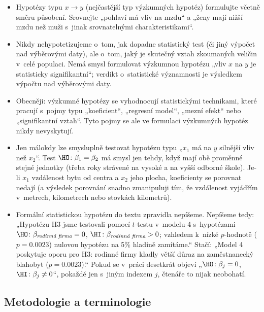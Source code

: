 \documentclass[11pt,a4paper]{article}
\begin{document}
\begin{itemize}[itemsep=2pt, topsep=2pt]
  \item Hypotézy typu $x \to y$ (nejčastější typ výzkumných hypotéz) formulujte včetně směru působení. Srovnejte „pohlaví má vliv na mzdu“ a „ženy mají nižší mzdu než muži s~jinak srovnatelnými charakteristikami“.
  \item Nikdy nehypotetizujeme o~tom, jak dopadne statistický test (či jiný výpočet nad výběrovými daty), ale o~tom, jaký je skutečný vztah zkoumaných veličin v~celé populaci. Nemá smysl formulovat výzkumnou hypotézu „vliv $x$ na $y$ je statisticky signifikantní“; verdikt o~statistické významnosti je výsledkem výpočtu nad výběrovými daty.
  \item Obecněji: výzkumné hypotézy se vyhodnocují statistickými technikami, které pracují s~pojmy typu „koeficient“, „regresní model“, „mezní efekt“ nebo „signifikantní vztah“. Tyto pojmy se ale ve formulaci výzkumných hypotéz nikdy nevyskytují.
  \item Jen málokdy lze smysluplně testovat hypotézu typu „$x_1$ má na $y$ silnější vliv než $x_2$“. Test $\HO\colon \beta_1 = \beta_2$ má smysl jen tehdy, když mají obě proměnné stejné jednotky (třeba roky strávené na vysoké a na vyšší odborné škole). Je-li $x_1$ vzdálenost bytu od centra a $x_2$ jeho plocha, koeficienty se porovnat nedají (a výsledek porovnání snadno zmanipuluji tím, že vzdálenost vyjádřím v~metrech, kilometrech nebo stovkách kilometrů).
  \item Formální statistickou hypotézu do textu zpravidla nepíšeme. Nepíšeme tedy: „Hypotézu H3 jsme testovali pomocí $t$-testu v~modelu 4 s~hypotézami $\HO\colon \beta_{\textit{rodinná firma}} = 0$, $\HI\colon \beta_{\textit{rodinná firma}} > 0$; vzhledem k~nízké $p$-hodnotě ($p = 0.0023$) nulovou hypotézu na 5\% hladině zamítáme.“ Stačí: „Model 4 poskytuje oporu pro H3: rodinné firmy kladly větší důraz na zaměstnanecký blahobyt ($p = 0.0023$).“ Pokud se v~práci desetkrát objeví „$\HO\colon \beta_j = 0$, $\HI\colon \beta_j \neq 0$“, pokaždé jen s~jiným indexem $j$, čtenáře to nijak neobohatí.
\end{itemize}

\subsection*{Metodologie a terminologie}
\end{document}
